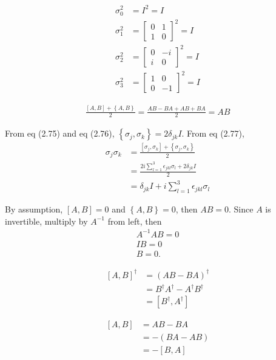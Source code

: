 \begin{align*}
	\sigma_0^2 &= I^2 = I\\
%
	\sigma_1^2 &= \begin{bmatrix}
	0 & 1 \\ 
	1 & 0
	\end{bmatrix} ^2 = I\\
%
	\sigma_2^2 &= \begin{bmatrix}
	0 & -i \\ 
	i & 0
	\end{bmatrix} ^2 = I\\
%
	\sigma_3^2 &= \begin{bmatrix}
	1 & 0 \\ 
	0 & -1
	\end{bmatrix} ^2 = I
\end{align*}



\begin{align*}
	\frac{\left[A, B \right] + \left\{A, B\right\}}{2} = \frac{AB - BA + AB + BA}{2} = AB
\end{align*}


From eq (2.75) and eq (2.76), $\left\{\sigma_j,  \sigma_k \right\} = 2 \delta_{jk} I$.
From eq (2.77),
\begin{align*}
	\sigma_j \sigma_k &= \frac{\left[\sigma_j, \sigma_k  \right] + \left\{\sigma_j, \sigma_k \right\}}{2}\\
		&= \frac{2i \sum_{l=1}^{3} \epsilon_{jkl}\sigma_l +  2 \delta_{jk} I}{2}\\
		&= \delta_{jk} I + i \sum_{l=1}^{3} \epsilon_{jkl}\sigma_l
\end{align*}


By assumption, $\left[A, B\right] = 0$ and $\left\{A, B\right\} = 0$, then $AB = 0$.
Since $A$ is invertible, multiply by $A^{-1}$ from left, then
\begin{align*}
	A^{-1} AB = 0\\
	IB = 0\\
	B=0.
\end{align*}


\begin{align*}
	\left[A, B\right]^\dagger &= (AB -BA)^\dagger\\
		&= B^\dagger A^\dagger - A^\dagger B^\dagger\\
		&= \left[B^\dagger, A^\dagger \right]
\end{align*}


\begin{align*}
	\left[A, B\right] &= AB - BA\\
		&= - (BA - AB)\\
		&= -\left[B, A\right]
\end{align*}

